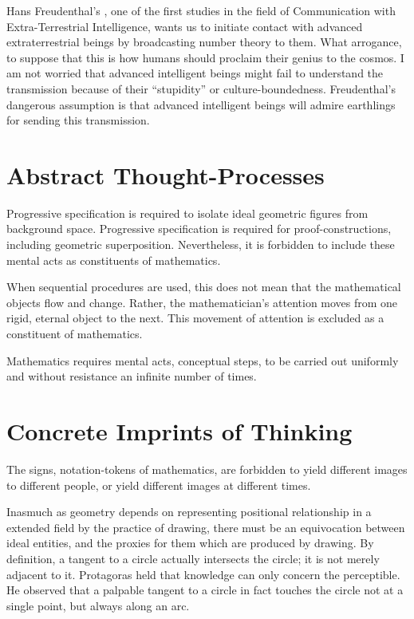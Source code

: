 \jarule

Hans Freudenthal's , one of the first studies in the field of Communication with Extra-Terrestrial Intelligence, wants us to initiate contact with advanced extraterrestrial beings by broadcasting number theory to them. What arrogance, to suppose that this is how humans should proclaim their genius to the cosmos. I am not worried that advanced intelligent beings might fail to understand the transmission because of their \enquote{stupidity} or culture-boundedness. Freudenthal's dangerous assumption is that advanced intelligent beings will admire earthlings for sending this transmission.

\jarule

\section{Abstract Thought-Processes}

Progressive specification is required to isolate ideal geometric figures from background space. Progressive specification is required for proof-constructions, including geometric superposition. Nevertheless, it is forbidden to include these mental acts as constituents of mathematics.

When sequential procedures are used, this does not mean that the mathematical objects flow and change. Rather, the mathematician's attention moves from one rigid, eternal object to the next. This movement of attention is excluded as a constituent of mathematics.

Mathematics requires mental acts, conceptual steps, to be carried out uniformly and without resistance an infinite number of times.

\jarule 

\section{Concrete Imprints of Thinking}

The signs, notation-tokens of mathematics, are forbidden to yield different images to different people, or yield different images at different times.

Inasmuch as geometry depends on representing positional relationship in a extended field by the practice of drawing, there must be an equivocation between ideal entities, and the proxies for them which are produced by drawing. By definition, a tangent to a circle actually intersects the circle; it is not merely adjacent to it. Protagoras held that knowledge can only concern the perceptible. He observed that a palpable tangent to a circle in fact touches the circle not at a single point, but always along an arc.

